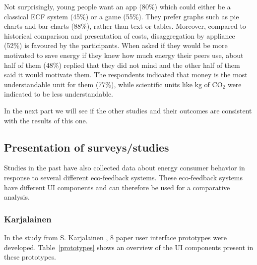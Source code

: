 \documentclass[journal]{vgtc}                %
\begin{document}
Not surprisingly, young people want an app (80\%) which could either be a classical ECF system (45\%) or a game (55\%).
They prefer graphs such as pie charts and bar charts (88\%), rather than text or tables. 
Moreover, compared to historical comparison and presentation of costs, disaggregation by appliance (52\%) is favoured by the participants.
When asked if they would be more motivated to save energy if they knew how much energy their peers use, about half of them (48\%) replied that they did not mind and the other half of them said it would motivate them.
The respondents indicated that money is the most understandable unit for them (77\%), while scientific units like kg of CO$_2$ were indicated to be less understandable.

In the next part we will see if the other studies and their outcomes are consistent with the results of this one.



\subsection{Presentation of surveys/studies} %
Studies in the past have also collected data about energy consumer behavior in response to several different eco-feedback systems. These eco-feedback systems have different UI components and can therefore be used for a comparative analysis.

\subsubsection{Karjalainen}
In the study from S. Karjalainen \cite{karjalainen2011consumer}, 8 paper user interface prototypes were developed. Table~\ref{prototypes} shows an overview of the UI components present in these prototypes.
\end{document}
